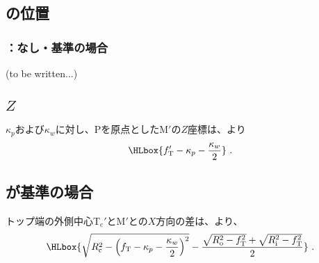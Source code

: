 \subsection{\KeywayCenter の位置}

\subsubsection{\KeywayCenter：\Outcut なし・\AsideKeywayDepth 基準の場合}
(to be written...)



\clearpage


\subsection{\KeywayCenter\texorpdfstring{$Z$}{Z}}
\KeywayPos$\kappa_p$および\KeywayWidth$\kappa_w$に対し、\TableCenter{}Pを原点とした\KeywayCenter M$'$の$Z$座標は、より
\begin{align*}
  \HLbox{f_\mathrm T'-\kappa_p-\frac{\kappa_w}2}\ .
\end{align*}


\subsection{\CurvatureCenter が基準の場合}
トップ端の外側中心T$_\mathrm c'$と\KeywayCenter M$'$との$X$方向の差は、より、
\begin{align*}
  \HLbox{%
    \sqrt{R_\mathrm c^2-\left(f_\mathrm T-\kappa_p-\frac{\kappa_w}2\right)^2}
    -\frac{\sqrt{R_\mathrm o^2-f_\mathrm T^2}+\sqrt{R_\mathrm i^2-f_\mathrm T^2}}2%
  }\ .
\end{align*}


